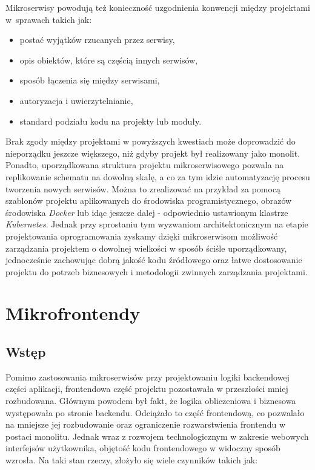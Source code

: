 \documentclass{SGGW-thesis}
\begin{document}
  Mikroserwisy powodują też konieczność uzgodnienia konwencji między projektami w~sprawach takich jak:

  \begin{itemize}
    \item postać wyjątków rzucanych przez serwisy,
    \item opis obiektów, które są częścią innych serwisów,
    \item sposób łączenia się między serwisami,
    \item autoryzacja i uwierzytelnianie,
    \item standard podziału kodu na projekty lub moduły.
  \end{itemize}
  Brak zgody między projektami w powyższych kwestiach może doprowadzić do nieporządku jeszcze większego, niż gdyby projekt był realizowany jako monolit. Ponadto, uporządkowana struktura projektu mikroserwisowego pozwala na replikowanie schematu na dowolną skalę, a co za tym idzie automatyzację procesu tworzenia nowych serwisów. Można to zrealizować na przykład za pomocą szablonów projektu aplikowanych do środowiska programistycznego, obrazów środowiska \textit{Docker} lub idąc jeszcze dalej - odpowiednio ustawionym klastrze \textit{Kubernetes}. Jednak przy sprostaniu tym wyzwaniom architektonicznym na etapie projektowania oprogramowania zyskamy dzięki mikroserwisom możliwość zarządzania projektem o dowolnej wielkości w sposób ściśle uporządkowany, jednocześnie zachowując dobrą jakość kodu źródłowego oraz łatwe dostosowanie projektu do potrzeb biznesowych i metodologii zwinnych zarządzania projektami.

\chapter{Mikrofrontendy}
  \section{Wstęp}
  Pomimo zastosowania mikroserwisów przy projektowaniu logiki backendowej części aplikacji, frontendowa część projektu pozostawała w przeszłości mniej rozbudowana. Głównym powodem był fakt, że logika obliczeniowa i biznesowa występowała po stronie backendu. Odciążało to część frontendową, co pozwalało na mniejsze jej rozbudowanie oraz ograniczenie rozwarstwienia frontendu w postaci monolitu. Jednak wraz z rozwojem technologicznym w zakresie webowych interfejsów użytkownika, objętość kodu frontendowego w widoczny sposób wzrosła. Na taki stan rzeczy, złożyło się wiele czynników takich jak:
  
\end{document}
